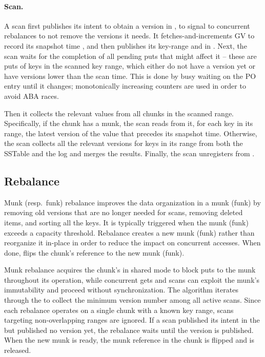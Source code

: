 \paragraph{Scan.}
A scan first publishes its intent to obtain a version in , to 
signal to concurrent rebalances to not remove the versions it needs. It
fetches-and-increments GV to record its snapshot time ,  
and then publishes its key-range and  in .
Next, the scan waits for the completion of all pending puts  
that might affect it  -- these are puts of keys in the scanned key range, which either do not have a version yet or have versions lower than the scan time.
This is done by busy waiting on the PO entry until it changes; monotonically increasing counters are used 
in order to avoid ABA races. 

Then it collects the relevant values from all chunks in the scanned range.
Specifically, if the chunk has a munk, the scan reads from it, for each key in its range, 
the latest version of the value that precedes its snapshot time.
Otherwise, the scan collects all the relevant versions for keys in its range from both 
the {SSTable}   and the {log} and merges the results.
Finally, the scan unregisters from .

\subsection{Rebalance}
\label{ssec:rebalance}

Munk (resp.\ funk) rebalance improves the data organization in a munk (funk) by removing old versions that are no longer needed 
for scans, removing deleted items, and sorting all the keys. It is typically triggered when the munk (funk) exceeds a capacity threshold.   
Rebalance creates  a new munk (funk) rather than reorganize it in-place 
in order to reduce the impact on concurrent accesses. When done, \sys\/ flips the 
chunk's reference to the new munk (funk).

Munk rebalance acquires the chunk's  in shared mode to 
block  puts to the munk throughout its operation, while concurrent gets and scans can exploit the munk's 
immutability and proceed without synchronization.  
%
The algorithm iterates through the  to collect the minimum version number among all active scans. 
Since each rebalance operates on a single chunk with a known key range, scans targeting non-overlapping ranges are ignored.
If a scan published its intent in the   but published no version yet, the rebalance waits until the version is published. 
When the new munk is ready, the munk reference in the chunk is flipped and  is released.

